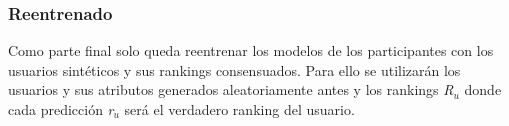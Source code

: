 \subsubsection{Reentrenado}
Como parte final solo queda reentrenar los modelos de los participantes con los usuarios sintéticos y sus rankings consensuados. Para ello se utilizarán los usuarios y sus atributos generados aleatoriamente antes y los rankings \textit{R$_{u}$} donde cada predicción \textit{r$_{u}$} será el verdadero ranking del usuario.
